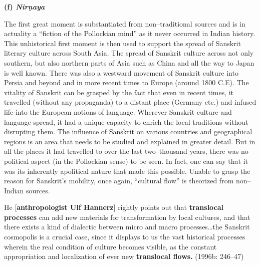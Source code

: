 \textbf{(f) \textit{Nirṇaya}}

The first great moment is substantiated from non–traditional sources and is in actuality a “fiction of the Pollockian mind” as it never occurred in Indian history. This unhistorical first moment is then used to support the spread of Sanskrit literary culture across South Asia. The spread of Sanskrit culture across not only southern, but also northern parts of Asia such as China and all the way to Japan is well known. There was also a westward movement of Sanskrit culture into Persia and beyond and in more recent times to Europe (around 1800 C.E). The vitality of Sanskrit can be grasped by the fact that even in recent times, it travelled (without any propaganda) to a distant place (Germany etc.) and infused life into the European notions of language. Wherever Sanskrit culture and language spread, it had a unique capacity to enrich the local traditions without disrupting them. The influence of Sanskrit on various countries and geographical regions is an area that needs to be studied and explained in greater detail. But in all the places it had travelled to over the last two–thousand years, there was no political aspect (in the Pollockian sense) to be seen. In fact, one can say that it was its inherently apolitical nature that made this possible. Unable to grasp the reason for Sanskrit’s mobility, once again, “cultural flow” is theorized from non–Indian sources.

\begin{myquote}
He [\textbf{anthropologist Ulf Hannerz}] rightly points out that \textbf{translocal processes} can add new materials for transformation by local cultures, and that there exists a kind of dialectic between micro and macro processes…the Sanskrit cosmopolis is a crucial case, since it displays to us the vast historical processes wherein the real condition of culture becomes visible, as the constant appropriation and localization of ever new \textbf{translocal flows.} (1996b: 246–47)
\end{myquote}

